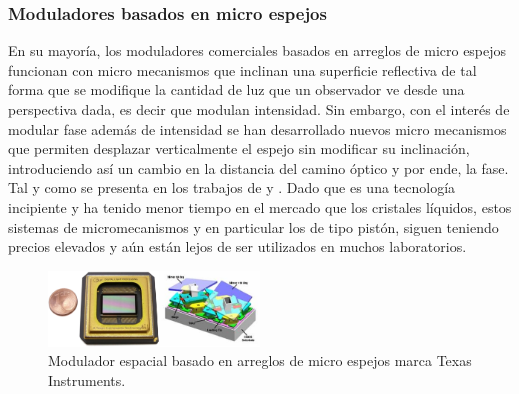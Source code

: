 \subsubsection{Moduladores basados en micro espejos}
En su mayoría, los moduladores comerciales basados en arreglos de micro
espejos funcionan con micro mecanismos que inclinan una superficie
reflectiva de tal forma que se modifique la cantidad de luz que un
observador ve desde una perspectiva dada, es decir que modulan
intensidad. Sin embargo, con el interés de modular fase además de
intensidad se han desarrollado nuevos micro mecanismos que
permiten desplazar verticalmente el espejo sin modificar su
inclinación, introduciendo así un cambio en la distancia del camino
óptico y por ende, la fase. Tal y como se presenta en los trabajos de
 y . Dado que es una
tecnología incipiente y ha tenido menor tiempo en el mercado que los
cristales líquidos, estos sistemas de micromecanismos y en particular los de tipo pistón,
siguen teniendo precios elevados y aún están lejos de ser utilizados
en muchos laboratorios. 
\begin{figure}[h!]
\centering
    \includegraphics[width=0.5\textwidth]{MEMSLM.png}
\caption[Modulador espacial basado en arreglos de micro espejos]{Modulador espacial basado en arreglos de micro espejos marca Texas Instruments.}
\label{fig:MEMSLM}
\end{figure}

